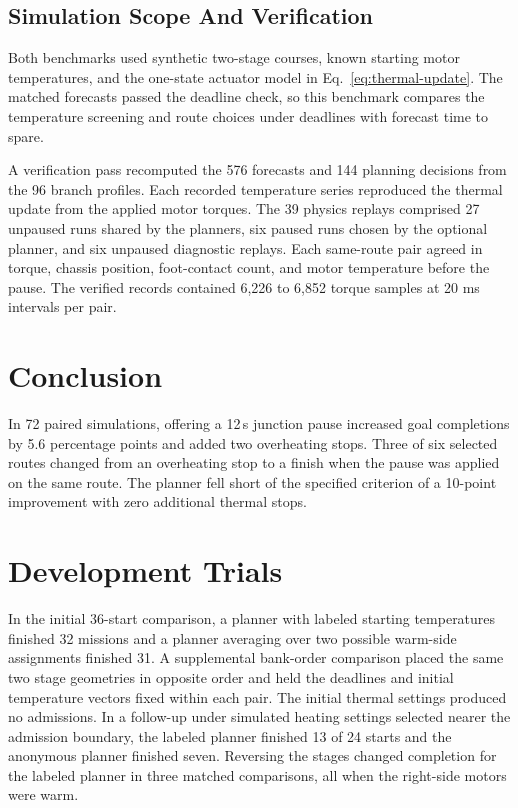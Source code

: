 \documentclass{ieeeaccess}
\begin{document}
\subsection{Simulation Scope And Verification}

Both benchmarks used synthetic two-stage courses, known starting motor temperatures, and the one-state actuator model in Eq.~\eqref{eq:thermal-update}. The matched forecasts passed the deadline check, so this benchmark compares the temperature screening and route choices under deadlines with forecast time to spare.

A verification pass recomputed the 576 forecasts and 144 planning decisions from the 96 branch profiles. Each recorded temperature series reproduced the thermal update from the applied motor torques. The 39 physics replays comprised 27 unpaused runs shared by the planners, six paused runs chosen by the optional planner, and six unpaused diagnostic replays. Each same-route pair agreed in torque, chassis position, foot-contact count, and motor temperature before the pause. The verified records contained 6,226 to 6,852 torque samples at 20 ms intervals per pair.

\section{Conclusion}

In 72 paired simulations, offering a 12\,s junction pause increased goal completions by 5.6 percentage points and added two overheating stops. Three of six selected routes changed from an overheating stop to a finish when the pause was applied on the same route. The planner fell short of the specified criterion of a 10-point improvement with zero additional thermal stops.

\appendices

\section{Development Trials}

In the initial 36-start comparison, a planner with labeled starting temperatures finished 32 missions and a planner averaging over two possible warm-side assignments finished 31. A supplemental bank-order comparison placed the same two stage geometries in opposite order and held the deadlines and initial temperature vectors fixed within each pair. The initial thermal settings produced no admissions. In a follow-up under simulated heating settings selected nearer the admission boundary, the labeled planner finished 13 of 24 starts and the anonymous planner finished seven. Reversing the stages changed completion for the labeled planner in three matched comparisons, all when the right-side motors were warm.
\end{document}
